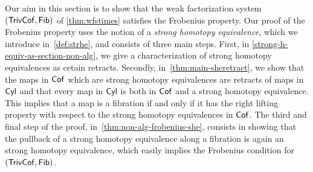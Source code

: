 \documentclass[reqno,10pt,a4paper,oneside,draft]{amsart}
\begin{document}
Our aim in this section is to show that
the weak factorization system $(\mathsf{TrivCof}, \mathsf{Fib})$ of  \cref{thm:wfstimes} satisfies the Frobenius property. Our proof of the Frobenius property uses the notion of a \emph{strong homotopy equivalence}, which we introduce in~\cref{def:strhe}, and consists of three main steps. First, in \cref{strong-h-equiv-as-section-non-alg},  we give a characterization of strong homotopy equivalences as cetain retracts. Secondly, in~\cref{thm:main-sheretract}, we show that the maps in $\mathsf{Cof}$ which are strong homotopy
equivalences are retracts of maps in $\mathsf{Cyl}$ and that every map in $\mathsf{Cyl}$ is both in $\mathsf{Cof}$ and a strong homotopy equivalence. This implies that a map is
a fibration if and only if it has the right lifting property with respect to the strong homotopy equivalences in $\mathsf{Cof}$. The third and final step of the proof, in~\cref{thm:non-alg-frobenius-she},  consists in showing that the pullback
of a strong homotopy equivalence along a fibration is again an strong homotopy equivalence, which easily implies 
the Frobenius condition for $(\mathsf{TrivCof}, \mathsf{Fib})$.
\end{document}
